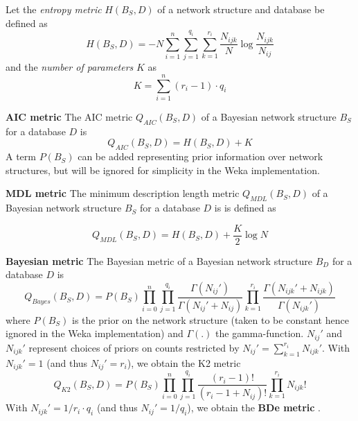 \documentclass[a4paper]{article}
\begin{document}
Let the {\em entropy metric} $H(B_S,D)$ of a network structure and database
be defined as
\begin{equation}\label{eq.H}
 H(B_S,D)=-N\sum_{i=1}^n\sum_{j=1}^{q_i}\sum_{k=1}^{r_i}\frac{N_{ijk}}{N}\log\frac{N_{ijk}}{N_{ij}}
\end{equation}
and the {\em number of parameters} $K$ as
\begin{equation}\label{eq.K}
K=\sum_{i=1}^n(r_i-1)\cdot q_i
\end{equation}

{\bf AIC metric} The AIC metric $Q_{AIC}(B_S,D)$ of a Bayesian network
structure $B_S$ for a database $D$ is
\begin{equation}\label{eq.AIC}
Q_{AIC}(B_S,D) = H(B_S,D)+K
\end{equation}
A term $P(B_S)$ can be added \cite{bouck1995} representing prior
information  over network structures, but will be ignored for
simplicity in the Weka implementation.


{\bf MDL metric} 
The minimum description length metric $Q_{MDL}(B_S,D)$
of a Bayesian network structure $B_S$ for a database $D$ is
is defined as

\begin{equation}\label{eq.MDL}
Q_{MDL}(B_S,D) = H(B_S,D)+\frac{K}{2}\log N
\end{equation}

{\bf Bayesian metric}
The Bayesian metric of a Bayesian network structure $B_D$ for a database $D$ is
$$
Q_{Bayes}(B_S,D) = P(B_S)\prod_{i=0}^n\prod_{j=1}^{q_i}\frac{\Gamma(N_{ij}')}{\Gamma(N_{ij}'+N_{ij})}
\prod_{k=1}^{r_i}\frac{\Gamma(N_{ijk}'+N_{ijk})}{\Gamma(N_{ijk}')}
$$
where $P(B_S)$ is the prior on the network structure (taken to be constant hence ignored 
in the Weka implementation) and $\Gamma(.)$ the gamma-function. $N_{ij}'$ and $N_{ijk}'$
represent choices of priors on counts restricted by 
$N_{ij}'=\sum_{k=1}^{r_i}N_{ijk}'$. With $N_{ijk}'=1$ (and thus $N_{ij}'=r_i$), 
we obtain the K2 metric \cite{CooperHerskovits1992}
$$
Q_{K2}(B_S,D) = P(B_S)\prod_{i=0}^n\prod_{j=1}^{q_i}\frac{(r_i-1)!}{(r_i-1+N_{ij})!}
\prod_{k=1}^{r_i}N_{ijk}!
$$
With $N_{ijk}'=1/r_i\cdot q_i$ (and thus $N_{ij}'=1/q_i$), we obtain the {\bf BDe metric}
\cite{heckerman95}.
\end{document}
